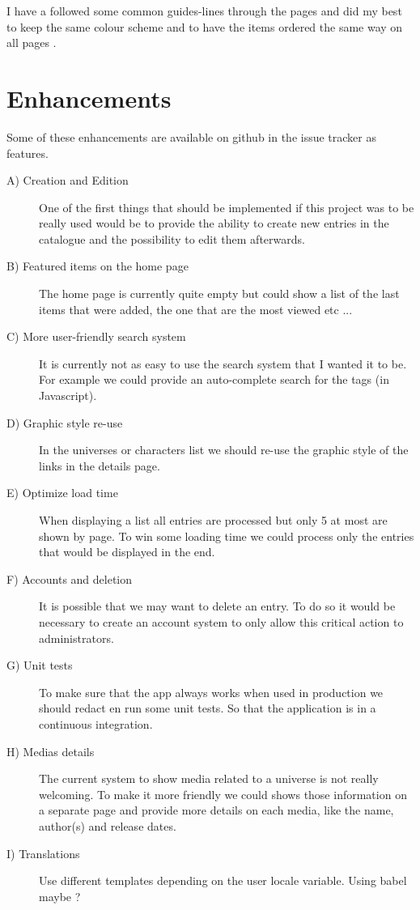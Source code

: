 \documentclass[10pt, a4paper]{article}
\begin{document}
	I have a followed some common guides-lines through the pages and did my best to keep the same colour scheme and to have the items ordered the same way on all pages .
	
	\section{Enhancements}
	Some of these enhancements are available on github in the issue tracker as features.
	\begin{description}
		\item[A) Creation and Edition] One of the first things that should be implemented if this project was to be really used would be to provide the ability to create new entries in the catalogue and the possibility to edit them afterwards.
		\item[B) Featured items on the home page] The home page is currently quite empty but could show a list of the last items that were added, the one that are the most viewed etc ...
		\item[C) More user-friendly search system] It is currently not as easy to use the search system that I wanted it to be. For example we could provide an auto-complete search for the tags (in Javascript).
		\item[D) Graphic style re-use] In the universes or characters list we should re-use the graphic style of the links in the details page. 
		\item[E) Optimize load time] When displaying a list all entries are processed but only 5 at most are shown by page. To win some loading time we could process only the entries that would be displayed in the end. 
		\item[F) Accounts and deletion] It is possible that we may want to delete an entry. To do so it would be necessary to create an account system to only allow this critical action to administrators.
		\item[G) Unit tests] To make sure that the app always works when used in production we should redact en run some unit tests. So that the application is in a continuous integration.
		\item[H) Medias details] The current system to show media related to a universe is not really welcoming. To make it more friendly we could shows those information on a separate page and provide more details on each media, like the name, author(s) and release dates.
		\item[I) Translations] Use different templates depending on the user locale variable. Using babel maybe ?
	\end{description}
	
\end{document}
